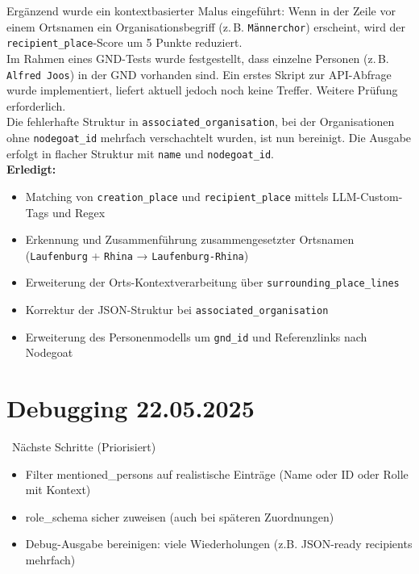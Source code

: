 \documentclass{article}
\begin{document}
\noindent{} Ergänzend wurde ein kontextbasierter Malus eingeführt: Wenn in der Zeile vor einem Ortsnamen ein Organisationsbegriff (z.\,B. \texttt{Männerchor}) erscheint, wird der \texttt{recipient\_place}-Score um 5 Punkte reduziert.\\

\noindent{} Im Rahmen eines GND-Tests wurde festgestellt, dass einzelne Personen (z.\,B. \texttt{Alfred Joos}) in der GND vorhanden sind. Ein erstes Skript zur API-Abfrage wurde implementiert, liefert aktuell jedoch noch keine Treffer. Weitere Prüfung erforderlich.\\

\noindent{} Die fehlerhafte Struktur in \texttt{associated\_organisation}, bei der Organisationen ohne \texttt{nodegoat\_id} mehrfach verschachtelt wurden, ist nun bereinigt. Die Ausgabe erfolgt in flacher Struktur mit \texttt{name} und \texttt{nodegoat\_id}.\\


\vspace{0.5em}
\noindent\textbf{Erledigt:}
\begin{itemize}
    \item Matching von \texttt{creation\_place} und \texttt{recipient\_place} mittels LLM-Custom-Tags und Regex
    \item Erkennung und Zusammenführung zusammengesetzter Ortsnamen (\texttt{Laufenburg} + \texttt{Rhina} → \texttt{Laufenburg-Rhina})
    \item Erweiterung der Orts-Kontextverarbeitung über \texttt{surrounding\_place\_lines}
    \item Korrektur der JSON-Struktur bei \texttt{associated\_organisation}
    \item Erweiterung des Personenmodells um \texttt{gnd\_id} und Referenzlinks nach Nodegoat
\end{itemize}


\noindent\hrulefill
\section{Debugging \small 22.05.2025}

\faStepForward\ Nächste Schritte (Priorisiert)
\begin{itemize}
\item Filter mentioned\_persons auf realistische Einträge (Name oder ID oder Rolle mit Kontext)
\item role\_schema sicher zuweisen (auch bei späteren Zuordnungen)
\item Debug-Ausgabe bereinigen: viele Wiederholungen (z.B. JSON-ready recipients mehrfach)
\end{itemize}
\end{document}
